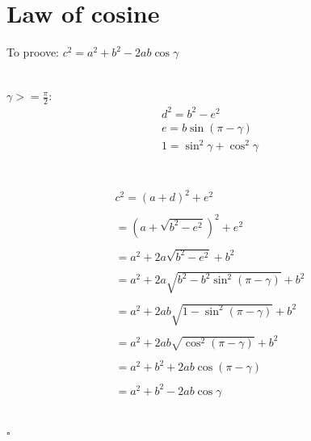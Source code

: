 \documentclass[a4paper]{article}
\begin{document}
\section{Law of cosine}
To proove: $c^2 = a^2+b^2-2ab\cos\gamma$
\\\\\\
$\gamma>=\frac{\pi}{2}:$
\begin{align}
d^2=b^2-e^2\\
e=b\sin(\pi-\gamma)\\
1=\sin^2\gamma+\cos^2\gamma
\end{align}
\\\\
\begin{align*}
c^2 = (a+d)^2+e^2
\\\\
=(a+\sqrt{b^2-e^2})^2+e^2
\\\\
=a^2+2a\sqrt{b^2-e^2}+b^2
\\\\
=a^2+2a\sqrt{b^2-b^2\sin^2(\pi-\gamma)}+b^2
\\\\
=a^2+2ab\sqrt{1-\sin^2(\pi-\gamma)}+b^2
\\\\
=a^2+2ab\sqrt{\cos^2(\pi-\gamma)}+b^2
\\\\
=a^2+b^2+2ab\cos(\pi-\gamma)
\\\\
=a^2+b^2-2ab\cos\gamma
\end{align*}
\\\\
$\square$
\newpage
\end{document}
